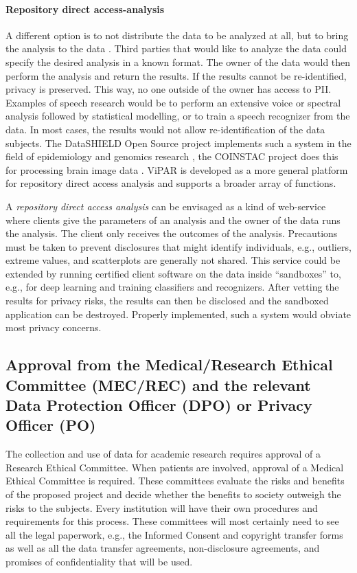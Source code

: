 \documentclass[10pt, a4paper]{article}
\begin{document}
\paragraph{Repository direct access-analysis} A different option is to not distribute the data to be analyzed at all, but to bring the analysis to the data \cite{budin2015datashield,DataSHIELD2014}. Third parties that would like to analyze the data could specify the desired analysis in a known format. The owner of the data would then perform the analysis and return the results. If the results cannot be re-identified, privacy is preserved. This way, no one outside of the owner has access to PII. Examples of speech research would be to perform an extensive voice or spectral analysis followed by statistical modelling, or to train a speech recognizer from the data. In most cases, the results would not allow re-identification of the data subjects. The DataSHIELD Open Source project implements such a system in the field of epidemiology and genomics research \cite{DataSHIELD,DataSHIELD2014,wilson2017datashield,budin2015datashield,SIMELL201998}, the COINSTAC project does this for processing brain image data \cite{plis2016coinstac}. ViPAR \cite{carter2016vipar} is developed as a more general platform for repository direct access analysis and supports a broader array of functions.

A {\em repository direct access analysis} can be envisaged as a kind of web-service where clients give the parameters of an analysis and the owner of the data runs the analysis. The client only receives the outcomes of the analysis. Precautions must be taken to prevent disclosures that might identify individuals, e.g., outliers, extreme values, and scatterplots are generally not shared. This service could be extended by running certified client software on the data inside ``sandboxes'' to, e.g., for deep learning and training classifiers and recognizers. After vetting the results for privacy risks, the results can then be disclosed and the sandboxed application can be destroyed. Properly implemented, such a system would obviate most privacy concerns.

\subsection{Approval from the Medical/Research Ethical Committee (MEC/REC) and the relevant Data Protection Officer (DPO) or Privacy Officer (PO)}

The collection and use of data for academic research requires approval of a Research Ethical Committee. When patients are involved, approval of a Medical Ethical Committee is required. These committees evaluate the risks and benefits of the proposed project and decide whether the benefits to society outweigh the risks to the subjects. Every institution will have their own procedures and requirements for this process. These committees will most certainly need to see all the legal paperwork, e.g., the Informed Consent and copyright transfer forms as well as all the data transfer agreements, non-disclosure agreements, and promises of confidentiality that will be used.
\end{document}
